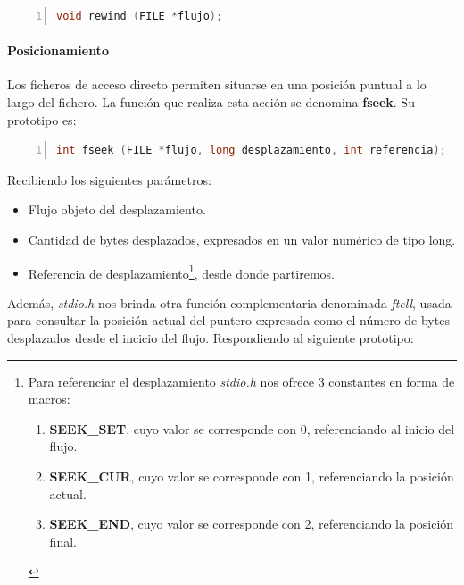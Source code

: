 \documentclass[a4paper, 11pt, titlepage]{article}
\begin{document}
            \begin{lstlisting}[language=C,numbers=left]
    void rewind (FILE *flujo);\end{lstlisting}

            \paragraph{Posicionamiento} Los ficheros de acceso directo permiten 
            situarse en una posición puntual a lo largo del fichero. La función 
            que realiza esta acción se denomina \textbf{fseek}. Su prototipo es:

            \begin{lstlisting}[language=C,numbers=left,basicstyle=\small]
    int fseek (FILE *flujo, long desplazamiento, int referencia);\end{lstlisting}
        
            Recibiendo los siguientes parámetros:

            \begin{itemize}
                \item Flujo objeto del desplazamiento.
                \item Cantidad de bytes desplazados, expresados en un valor numérico 
                de tipo long.
                \item Referencia de desplazamiento\footnote{
                    Para referenciar el desplazamiento \textit{stdio.h} nos ofrece 3
                    constantes en forma de macros:

                    \begin{enumerate}
                        \item \textbf{SEEK\_SET}, cuyo valor se corresponde con 0, referenciando 
                        al inicio del flujo.
                        \item \textbf{SEEK\_CUR}, cuyo valor se corresponde con 1, referenciando 
                        la posición actual.
                        \item \textbf{SEEK\_END}, cuyo valor se corresponde con 2, referenciando 
                        la posición final.
                    \end{enumerate}
                }, desde donde partiremos.
            \end{itemize}

            Además, \textit{stdio.h} nos brinda otra función complementaria denominada 
            \textit{ftell}, usada para consultar la posición actual del puntero expresada 
            como el número de bytes desplazados desde el incicio del flujo. Respondiendo 
            al siguiente prototipo:
            
\end{document}
